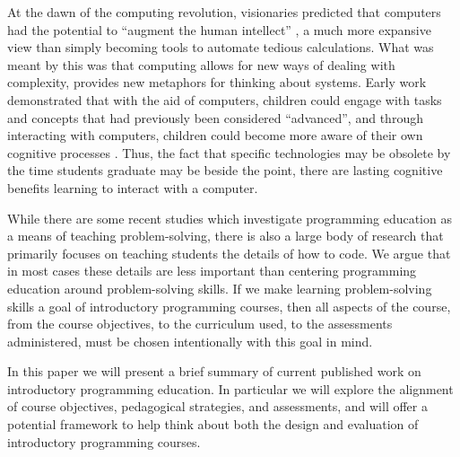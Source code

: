 \documentclass[12pt]{article}
\begin{document}
At the dawn of the computing revolution, visionaries predicted that
computers had the potential to ``augment the human intellect''
\autocite{engelbart_augmenting_1962}, a much more expansive view than
simply becoming tools to automate tedious calculations. What was meant
by this was that computing allows for new ways of dealing with
complexity, provides new metaphors for thinking about
systems\autocite{kay_history_1996}. Early work demonstrated that with
the aid of computers, children could engage with tasks and concepts
that had previously been considered ``advanced'', and through
interacting with computers, children could become more aware of their
own cognitive processes \autocite{papert_mindstorms_1980}. Thus, the
fact that specific technologies may be obsolete by the time students
graduate may be beside the point, there are lasting cognitive benefits
learning to interact with a computer.

While there are some recent studies which investigate programming
education as a means of teaching problem-solving, there is also a
large body of research that primarily focuses on teaching students the
details of how to code. We argue that in most cases these details are
less important than centering programming education around
problem-solving skills. If we make learning problem-solving skills a
goal of introductory programming courses, then all aspects of the
course, from the course objectives, to the curriculum used, to the
assessments administered, must be chosen intentionally with this goal
in mind. 

In this paper we will present a brief summary of current published
work on introductory programming education. In particular we will
explore the alignment of course objectives, pedagogical strategies,
and assessments, and will offer a potential framework to help think
about both the design and evaluation of introductory programming
courses.




\end{document}
